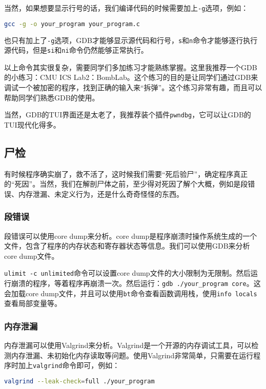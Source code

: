 当然，如果想要显示行号的话，我们编译代码的时候需要加上\texttt{-g}选项，例如：
\begin{lstlisting}[language=bash]
    gcc -g -o your_program your_program.c
\end{lstlisting}
也只有加上了\texttt{-g}选项，GDB才能够显示源代码和行号，\texttt{s}和\texttt{n}命令才能够逐行执行源代码，但是\texttt{si}和\texttt{ni}命令仍然能够正常执行。

以上命令其实很复杂，需要同学们多加练习才能熟练掌握。这里我推荐一个GDB的小练习：CMU ICS Lab2：BombLab。这个练习的目的是让同学们通过GDB来调试一个被加密的程序，找到正确的输入来“拆弹”。这个练习非常有趣，而且可以帮助同学们熟悉GDB的使用。

当然，GDB的TUI界面还是太老了，我推荐装个插件\texttt{pwndbg}，它可以让GDB的TUI现代化得多。

\subsection{尸检}

有时候程序确实崩了，救不活了，这时候我们需要“死后验尸”，确定程序真正的“死因”。当然，我们在解剖尸体之前，至少得对死因了解个大概，例如是段错误、内存泄漏、未定义行为，还是什么奇奇怪怪的东西。

\subsubsection{段错误}

段错误可以使用core dump来分析。core dump是程序崩溃时操作系统生成的一个文件，包含了程序的内存状态和寄存器状态等信息。我们可以使用GDB来分析core dump文件。

\texttt{ulimit -c unlimited}命令可以设置core dump文件的大小限制为无限制。然后运行崩溃的程序，等着程序再崩溃一次。然后运行：\texttt{gdb ./your\_program core}。这会加载core dump文件，并且可以使用\texttt{bt}命令查看函数调用栈，使用\texttt{info locals}查看局部变量等。

\subsubsection{内存泄漏}

内存泄漏可以使用Valgrind来分析。Valgrind是一个开源的内存调试工具，可以检测内存泄漏、未初始化内存读取等问题。使用Valgrind非常简单，只需要在运行程序时加上\texttt{valgrind}命令即可，例如：
\begin{lstlisting}[language=bash]
    valgrind --leak-check=full ./your_program
\end{lstlisting}

